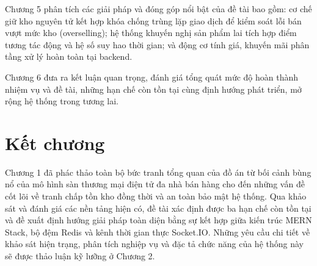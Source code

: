 \documentclass[../DoAn.tex]{subfiles}
\begin{document}
Chương 5 phân tích các giải pháp và đóng góp nổi bật của đề tài bao gồm: cơ chế giữ kho nguyên tử kết hợp khóa chống trùng lặp giao dịch để kiểm soát lỗi bán vượt mức kho (overselling); hệ thống khuyến nghị sản phẩm lai tích hợp điểm tương tác động và hệ số suy hao thời gian; và động cơ tính giá, khuyến mãi phân tầng xử lý hoàn toàn tại backend.

Chương 6 đưa ra kết luận quan trọng, đánh giá tổng quát mức độ hoàn thành nhiệm vụ và đề tài, những hạn chế còn tồn tại cùng định hướng phát triển, mở rộng hệ thống trong tương lai.

\section*{Kết chương}
Chương 1 đã phác thảo toàn bộ bức tranh tổng quan của đồ án từ bối cảnh bùng nổ của mô hình sàn thương mại điện tử đa nhà bán hàng cho đến những vấn đề cốt lõi về tranh chấp tồn kho đồng thời và an toàn bảo mật hệ thống. Qua khảo sát và đánh giá các nền tảng hiện có, đề tài xác định được ba hạn chế còn tồn tại và đề xuất định hướng giải pháp toàn diện bằng sự kết hợp giữa kiến trúc MERN Stack, bộ đệm Redis và kênh thời gian thực Socket.IO. Những yêu cầu chi tiết về khảo sát hiện trạng, phân tích nghiệp vụ và đặc tả chức năng của hệ thống này sẽ được thảo luận kỹ lưỡng ở Chương 2.
\end{document}
